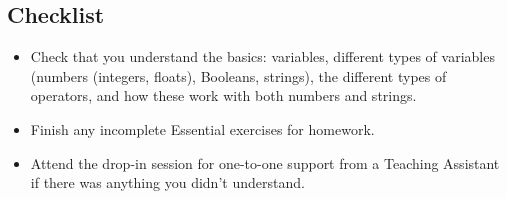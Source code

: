 \documentclass[12pt]{article}
\begin{document}
\subsection*{Checklist}
\begin{itemize}
	\item Check that you understand the basics: variables, different types of variables (numbers (integers, floats), Booleans, strings), the different types of operators, and how these work with both numbers and strings.
	\item Finish any incomplete Essential exercises for homework. 
	\item Attend the drop-in session for one-to-one support from a Teaching Assistant if there was anything you didn't understand.
\end{itemize}
\end{document}
